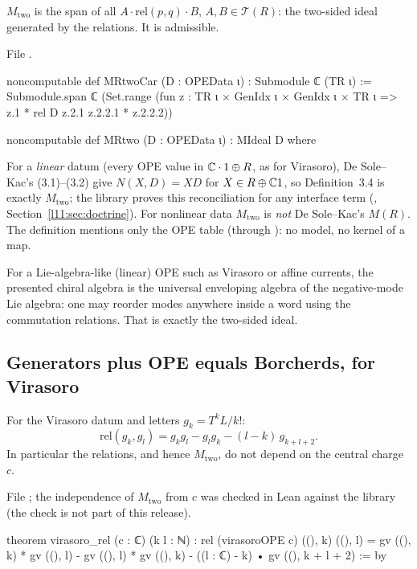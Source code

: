 \begin{definition}\label{l11:def:MRtwo}
$M_{\mathrm{two}}$ is the span of all $A\cdot\mathrm{rel}(p,q)\cdot B$, $A,B\in\mathcal T(R)$: the two-sided ideal generated by the
relations. It is admissible.
\end{definition}
\noindent File .
\begin{leancode}
noncomputable def MRtwoCar (D : OPEData ι) : Submodule ℂ (TR ι) :=
  Submodule.span ℂ (Set.range (fun z : TR ι × GenIdx ι × GenIdx ι × TR ι =>
    z.1 * rel D z.2.1 z.2.2.1 * z.2.2.2))

noncomputable def MRtwo (D : OPEData ι) : MIdeal D where
\end{leancode}

\begin{dictionary}
For a \emph{linear} datum (every OPE value in ${\mathbb{C}}\cdot1\oplus R$, as for Virasoro), De Sole--Kac's (3.1)--(3.2) give $N(X,D) = XD$ for
$X\in R\oplus{\mathbb{C}}1$, so Definition~3.4 is exactly $M_{\mathrm{two}}$; the library proves this reconciliation for any interface term
(, Section~\ref{l11:sec:doctrine}). For nonlinear data $M_{\mathrm{two}}$ is \emph{not} De Sole--Kac's
$M(R)$. The definition mentions only the OPE table (through ): no model, no kernel of a map.
\end{dictionary}

\begin{physics}
For a Lie-algebra-like (linear) OPE such as Virasoro or affine currents, the presented chiral algebra is the universal enveloping
algebra of the negative-mode Lie algebra: one may reorder modes anywhere inside a word using the commutation relations. That is
exactly the two-sided ideal.
\end{physics}

\subsection{Generators plus OPE equals Borcherds, for Virasoro}

\begin{theorem}\label{l11:thm:virrel}
For the Virasoro datum and letters $g_k = T^kL/k!$:
\begin{equation*}
\mathrm{rel}(g_k,g_l) = g_kg_l - g_lg_k - (l-k)\,g_{k+l+2}.
\end{equation*}
In particular the relations, and hence $M_{\mathrm{two}}$, do not depend on the central charge $c$.
\end{theorem}
\noindent File ; the independence of $M_{\mathrm{two}}$
from $c$ was checked in Lean against the library (the check is not part of this release).
\begin{leancode}
theorem virasoro_rel (c : ℂ) (k l : ℕ) :
    rel (virasoroOPE c) ((), k) ((), l)
      = gv ((), k) * gv ((), l) - gv ((), l) * gv ((), k)
        - ((l : ℂ) - k) • gv ((), k + l + 2) := by
\end{leancode}

